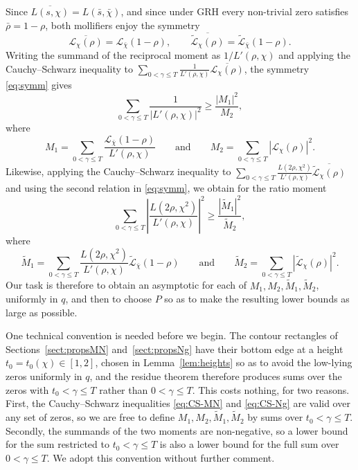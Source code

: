 \documentclass[10pt,a4paper]{amsart}
\numberwithin{equation}{section}
\begin{document}
Since $\overline{L(s,\chi)}=L(\bar s,\bar\chi)$, and since under GRH every non-trivial zero satisfies $\bar\rho=1-\rho$, both mollifiers enjoy the symmetry
\begin{equation}\label{eq:symm}
\overline{\mathcal{L}_{\chi}(\rho)}=\mathcal{L}_{\bar\chi}(1-\rho),
\qquad
\overline{\widetilde{\mathcal{L}}_{\chi}(\rho)}=\widetilde{\mathcal{L}}_{\bar\chi}(1-\rho).
\end{equation}
Writing the summand of the reciprocal moment as $1/L'(\rho,\chi)$ and applying the Cauchy--Schwarz inequality to $\sum_{0<\gamma\le T}\frac{1}{L'(\rho,\chi)}\overline{\mathcal{L}_\chi(\rho)}$, the symmetry \eqref{eq:symm} gives
\begin{equation}\label{eq:CS-MN}
\sum_{0<\gamma\le T}\frac{1}{|L'(\rho,\chi)|^2}\ge\frac{|M_1|^2}{M_2},
\end{equation}
where
\[
M_1=\sum_{0<\gamma\le T}\frac{\mathcal{L}_{\bar\chi}(1-\rho)}{L'(\rho,\chi)}
\qquad\text{and}\qquad
M_2=\sum_{0<\gamma\le T}|\mathcal{L}_{\chi}(\rho)|^2 .
\]
Likewise, applying the Cauchy--Schwarz inequality to $\sum_{0<\gamma\le T}\frac{L(2\rho,\chi^2)}{L'(\rho,\chi)}\overline{\widetilde{\mathcal{L}}_\chi(\rho)}$ and using the second relation in \eqref{eq:symm}, we obtain for the ratio moment
\begin{equation}\label{eq:CS-Ng}
\sum_{0<\gamma\le T}\left|\frac{L(2\rho,\chi^2)}{L'(\rho,\chi)}\right|^2\ge\frac{|\widetilde M_1|^2}{\widetilde M_2},
\end{equation}
where
\[
\widetilde M_1=\sum_{0<\gamma\le T}\frac{L(2\rho,\chi^2)}{L'(\rho,\chi)}\widetilde{\mathcal{L}}_{\bar\chi}(1-\rho)
\qquad\text{and}\qquad
\widetilde M_2=\sum_{0<\gamma\le T}|\widetilde{\mathcal{L}}_{\chi}(\rho)|^2 .
\]
Our task is therefore to obtain an asymptotic for each of $M_1,M_2,\widetilde M_1,\widetilde M_2$, uniformly in $q$, and then to choose $P$ so as to make the resulting lower bounds as large as possible.

One technical convention is needed before we begin. The contour rectangles of Sections~\ref{sect:propsMN} and~\ref{sect:propsNg} have their bottom edge at a height $t_0=t_0(\chi)\in[1,2]$, chosen in Lemma~\ref{lem:heights} so as to avoid the low-lying zeros uniformly in $q$, and the residue theorem therefore produces sums over the zeros with $t_0<\gamma\le T$ rather than $0<\gamma\le T$. This costs nothing, for two reasons. First, the Cauchy--Schwarz inequalities \eqref{eq:CS-MN} and \eqref{eq:CS-Ng} are valid over any set of zeros, so we are free to define $M_1,M_2,\widetilde M_1,\widetilde M_2$ by sums over $t_0<\gamma\le T$. Secondly, the summands of the two moments are non-negative, so a lower bound for the sum restricted to $t_0<\gamma\le T$ is also a lower bound for the full sum over $0<\gamma\le T$. We adopt this convention without further comment.
\end{document}
